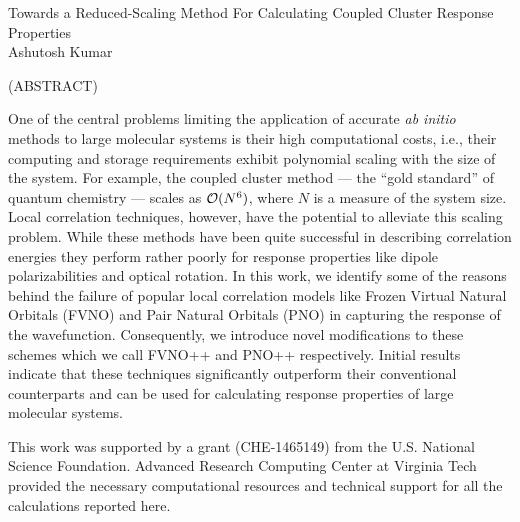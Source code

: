 \documentclass[12pt]{report}
\begin{document}
\thispagestyle{empty}
\begin{center}

{\Large
Towards a Reduced-Scaling Method For Calculating Coupled Cluster Response Properties 
}\\

\vspace{8em}
Ashutosh Kumar
\vspace{8em}


(ABSTRACT)


\end{center}
One of the central problems limiting the application of accurate {\em ab
initio} methods to large molecular systems is their high computational costs,
i.e., their computing and storage requirements exhibit polynomial scaling with
the size of the system.  For example, the coupled cluster method --- the
``gold standard'' of quantum chemistry --- scales as ${\cal O}(N^6)$, where
$N$ is a measure of the system size. Local correlation techniques, however, have 
the potential to alleviate this scaling problem. While these methods have been
quite successful in describing correlation energies they perform rather poorly 
for response properties like dipole polarizabilities and optical rotation. In 
this work, we identify some of the reasons behind the failure of popular
local correlation models like Frozen Virtual Natural Orbitals (FVNO) and Pair Natural
Orbitals (PNO) in capturing the response of the wavefunction. Consequently, we introduce 
novel modifications to these schemes which we call FVNO++ and PNO++ respectively.
Initial results indicate that these techniques significantly outperform their 
conventional counterparts and can be used for calculating response properties 
of large molecular systems.

\vfill
This work was supported by a grant (CHE-1465149) from
the U.S. National Science Foundation. Advanced Research Computing 
Center at Virginia Tech provided the necessary computational resources and technical 
support for all the calculations reported here.

\pagebreak

\end{document}
